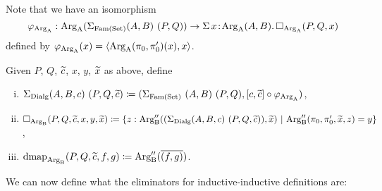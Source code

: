 \documentclass[orivec,envcountsame, ,envcountsect]{llncs}
\begin{document}
\noindent Note that we have an isomorphism
\[
\varphi_{\text{Arg}_{\text{A}}} : \text{Arg}_{\text{A}}(\Sigma_{\text{Fam}(\text{Set})} (A, B)\ (P, Q)) \to \Sigma\,x\!:\! \text{Arg}_{\text{A}}(A, B) .\, \Box_{\text{Arg}_{\text{A}}}(P, Q, x)
\]
defined by $\varphi_{\text{Arg}_{\text{A}}}(x) = \langle \text{Arg}_{\text{A}}(\pi_0, \pi'_0)(x), x\rangle$.

\begin{definition}
Given $P$, $Q$, $\widetilde{c}$, $x$, $y$, $\widetilde{x}$ as above, define
  \begin{enumerate}[(i)]
  \item $\Sigma_{\text{Dialg}} (A, B, c)\ (P, Q, \widetilde{c}) \coloneqq (\Sigma_{\text{Fam}(\text{Set})}\ (A,
    B)\ (P, Q), [c, \widetilde{c}] \circ \varphi_{\text{Arg}_{\text{A}}})$,
  \item $\Box_{\text{Arg}_{\text{B}}}(P, Q, \widetilde{c}, x, y, \widetilde{x}) \coloneqq \\
\{ z : \text{Arg}_{\text{B}}''((\Sigma_{\text{Dialg}} (A, B, c)\ (P, Q, \widetilde{c})), \widetilde{x}
)\ |\ \text{Arg}_{\text{B}}''(\pi_0, \pi'_0, \widetilde{x}, z) = y \}$,
\item $\text{dmap}_{\text{Arg}_{\text{B}}}(P, Q, \widetilde{c}, f, g) \coloneqq \text{Arg}_{\text{B}}''(\overline{(f, g)})$.
  \end{enumerate}
\end{definition}
We can now define what the eliminators for inductive-inductive definitions are:
\end{document}

